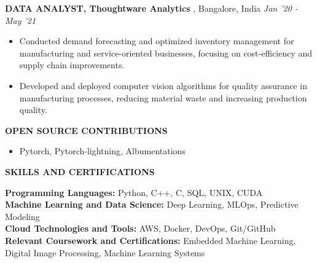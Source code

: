 \documentclass[11pt,a3]{article}
\def\hrulefill{\leavevmode\leaders\hrule height 1pt\hfill\kern 0pt}		%
\begin{document}
{\begin{flushleft}
		\textbf{\large DATA ANALYST, Thoughtware Analytics }, \large Bangalore, India \hfill \textit{\large Jan '20 - May '21}	\\		
		\begin{itemize}
			  
			\item Conducted demand forecasting and optimized inventory management for manufacturing and service-oriented businesses, focusing on cost-efficiency and supply chain improvements.
			\item Developed and deployed computer vision algorithms for quality assurance in manufacturing processes, reducing material waste and increasing production quality.   
        \end{itemize}	

        \textbf{\large OPEN SOURCE CONTRIBUTIONS}
        \begin{itemize}
            \item Pytorch, Pytorch-lightning, Albumentations
        \end{itemize}
\end{flushleft}
%		
	
	
%		
%		



\begin{flushleft}
    {\Large \textbf {SKILLS AND CERTIFICATIONS}}
    
        \vspace{1.5mm}
        \textbf{Programming Languages:} Python, C++, C, SQL, UNIX, CUDA \\
        \textbf{Machine Learning and Data Science:} Deep Learning, MLOps, Predictive Modeling   \\
        \textbf{Cloud Technologies and Tools:} AWS, Docker, DevOps, Git/GitHub \\
        \textbf{Relevant Coursework and Certifications:} Embedded Machine Learning, Digital Image Processing, Machine Learning Systems \\

\end{flushleft}
       
}
\end{document}
